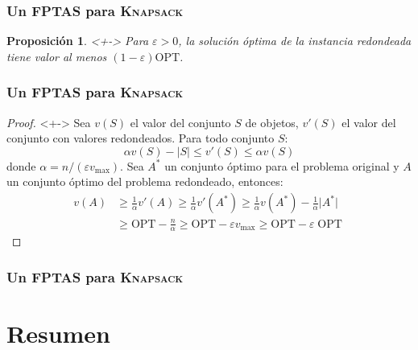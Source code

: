 \documentclass[english, spanish, fleqn,%
hyperref = {colorlinks, urlcolor = blue}%
]{beamer}
\newtheorem{proposition}{Proposición}
\begin{document}
\begin{frame}
  \setcounter{beamerpauses}{2}
  \frametitle{Un FPTAS para \textsc{Knapsack}}

    \begin{proposition}<+->
      Para \(\varepsilon > 0\),
      la solución óptima de la instancia redondeada
      tiene valor al menos \((1 - \varepsilon) \mathrm{OPT}\).
    \end{proposition}
\end{frame}

\begin{frame}
  \setcounter{beamerpauses}{2}
  \frametitle{Un FPTAS para \textsc{Knapsack}}

  \begin{proof}<+->
    Sea \(v(S)\) el valor del conjunto \(S\) de objetos,
    \(v'(S)\) el valor del conjunto con valores redondeados.
    Para todo conjunto \(S\):
    \begin{equation*}
      \alpha v(S) - \lvert S \rvert
        \le v'(S)
        \le \alpha v(S)
    \end{equation*}
    donde \(\alpha = n / (\varepsilon v_{\mathrm{max}})\).
    Sea \(A^*\) un conjunto óptimo para el problema original
    y \(A\) un conjunto óptimo del problema redondeado,
    entonces:
    \begin{align*}
      v(A)
        &\ge \frac{1}{\alpha} v'(A)
         \ge \frac{1}{\alpha} v'(A^*)
         \ge \frac{1}{\alpha} v(A^*) - \frac{1}{\alpha} \lvert A^* \rvert \\
        &\ge \mathrm{OPT} - \frac{n}{\alpha}
         \ge \mathrm{OPT} - \varepsilon v_{\mathrm{max}}
         \ge \mathrm{OPT} - \varepsilon \operatorname{OPT}
    \end{align*}
  \end{proof}
\end{frame}

\begin{frame}
  \setcounter{beamerpauses}{2}
  \frametitle{Un FPTAS para \textsc{Knapsack}}

\end{frame}

\section{Resumen}
\end{document}

